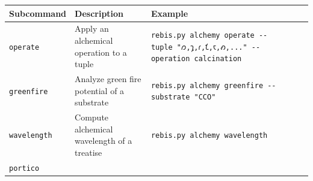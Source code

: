 \documentclass[12pt,a4paper]{article}
\begin{document}
\begin{longtable}[]{@{}lll@{}}
\toprule
\begin{minipage}[b]{0.32\columnwidth}\raggedright
Subcommand\strut
\end{minipage} & \begin{minipage}[b]{0.35\columnwidth}\raggedright
Description\strut
\end{minipage} & \begin{minipage}[b]{0.24\columnwidth}\raggedright
Example\strut
\end{minipage}\tabularnewline
\midrule
\endhead
\begin{minipage}[t]{0.32\columnwidth}\raggedright
\texttt{operate}\strut
\end{minipage} & \begin{minipage}[t]{0.35\columnwidth}\raggedright
Apply an alchemical operation to a tuple\strut
\end{minipage} & \begin{minipage}[t]{0.24\columnwidth}\raggedright
\texttt{rebis.py\ alchemy\ operate\ -\/-tuple\ "𐑼,𐑡,𐑩,𐑗,𐑱,𐑺,..."\ -\/-operation\ calcination}\strut
\end{minipage}\tabularnewline
\begin{minipage}[t]{0.32\columnwidth}\raggedright
\texttt{greenfire}\strut
\end{minipage} & \begin{minipage}[t]{0.35\columnwidth}\raggedright
Analyze green fire potential of a substrate\strut
\end{minipage} & \begin{minipage}[t]{0.24\columnwidth}\raggedright
\texttt{rebis.py\ alchemy\ greenfire\ -\/-substrate\ "CCO"}\strut
\end{minipage}\tabularnewline
\begin{minipage}[t]{0.32\columnwidth}\raggedright
\texttt{wavelength}\strut
\end{minipage} & \begin{minipage}[t]{0.35\columnwidth}\raggedright
Compute alchemical wavelength of a treatise\strut
\end{minipage} & \begin{minipage}[t]{0.24\columnwidth}\raggedright
\texttt{rebis.py\ alchemy\ wavelength}\strut
\end{minipage}\tabularnewline
\begin{minipage}[t]{0.32\columnwidth}\raggedright
\texttt{portico}\strut
\end{minipage} & \begin{minipage}[t]{0.35\columnwidth}\raggedright

\end{minipage}
\end{longtable}
\end{document}
